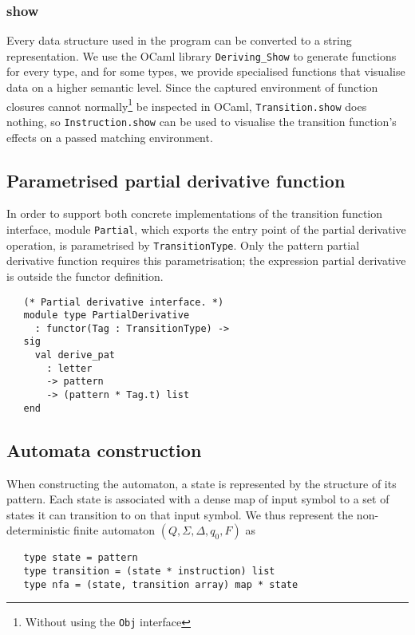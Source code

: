 \subsubsection{show}

Every data structure used in the program can be converted to a string
representation. We use the OCaml library \texttt{Deriving\_Show} to generate
functions for every type, and for some types, we provide specialised functions
that visualise data on a higher semantic level. Since the captured environment
of function closures cannot normally\footnote{Without using the \texttt{Obj}
interface} be inspected in OCaml, \texttt{Transition.show} does nothing, so
\texttt{Instruction.show} can be used to visualise the transition function's
effects on a passed matching environment.


\subsection{Parametrised partial derivative function}

In order to support both concrete implementations of the transition function
interface, module \texttt{Partial}, which exports the entry point of the partial
derivative operation, is parametrised by \texttt{TransitionType}. Only the
pattern partial derivative function requires this parametrisation; the
expression partial derivative is outside the functor definition.

\needspace{3cm}
\begin{lstlisting}
   (* Partial derivative interface. *)
   module type PartialDerivative
     : functor(Tag : TransitionType) ->
   sig
     val derive_pat
       : letter
       -> pattern
       -> (pattern * Tag.t) list
   end
\end{lstlisting}


\subsection{Automata construction}

When constructing the automaton, a state is represented by the structure of its
pattern. Each state is associated with a dense map of input symbol to a set of
states it can transition to on that input symbol. We thus represent the
non-deterministic finite automaton $(Q, \Sigma, \Delta, q_0, F)$ as

\begin{lstlisting}
   type state = pattern
   type transition = (state * instruction) list
   type nfa = (state, transition array) map * state
\end{lstlisting}

